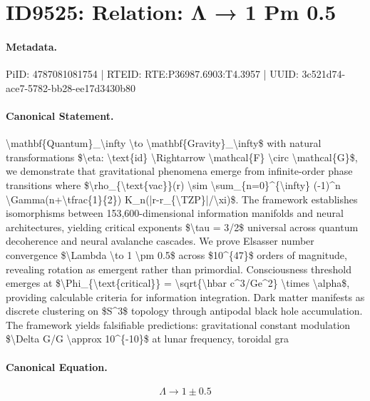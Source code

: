 \section*{ID9525: Relation: Λ → 1 Pm 0.5}
\paragraph{Metadata.}
PiID: 4787081081754 | RTEID: RTE:P36987.6903:T4.3957 | UUID: 3c521d74-ace7-5782-bb28-ee17d3430b80

\paragraph{Canonical Statement.}
\textbackslash{}mathbf\{Quantum\}\_\textbackslash{}infty \textbackslash{}to \textbackslash{}mathbf\{Gravity\}\_\textbackslash{}infty\$ with natural transformations \$\textbackslash{}eta: \textbackslash{}text\{id\} \textbackslash{}Rightarrow \textbackslash{}mathcal\{F\} \textbackslash{}circ \textbackslash{}mathcal\{G\}\$, we demonstrate that gravitational phenomena emerge from infinite-order phase transitions where \$\textbackslash{}rho\_\{\textbackslash{}text\{vac\}\}(r) \textbackslash{}sim \textbackslash{}sum\_\{n=0\}\textasciicircum{}\{\textbackslash{}infty\} (-1)\textasciicircum{}n \textbackslash{}Gamma(n+\textbackslash{}tfrac\{1\}\{2\}) K\_n(|r-r\_\{\textbackslash{}TZP\}|/\textbackslash{}xi)\$. The framework establishes isomorphisms between 153,600-dimensional information manifolds and neural architectures, yielding critical exponents \$\textbackslash{}tau = 3/2\$ universal across quantum decoherence and neural avalanche cascades. We prove Elsasser number convergence \$\textbackslash{}Lambda \textbackslash{}to 1 \textbackslash{}pm 0.5\$ across \$10\textasciicircum{}\{47\}\$ orders of magnitude, revealing rotation as emergent rather than primordial. Consciousness threshold emerges at \$\textbackslash{}Phi\_\{\textbackslash{}text\{critical\}\} = \textbackslash{}sqrt\{\textbackslash{}hbar c\textasciicircum{}3/Ge\textasciicircum{}2\} \textbackslash{}times \textbackslash{}alpha\$, providing calculable criteria for information integration. Dark matter manifests as discrete clustering on \$S\textasciicircum{}3\$ topology through antipodal black hole accumulation. The framework yields falsifiable predictions: gravitational constant modulation \$\textbackslash{}Delta G/G \textbackslash{}approx 10\textasciicircum{}\{-10\}\$ at lunar frequency, toroidal gra

\paragraph{Canonical Equation.}
\[
\Lambda \to 1 \pm 0.5
\]

